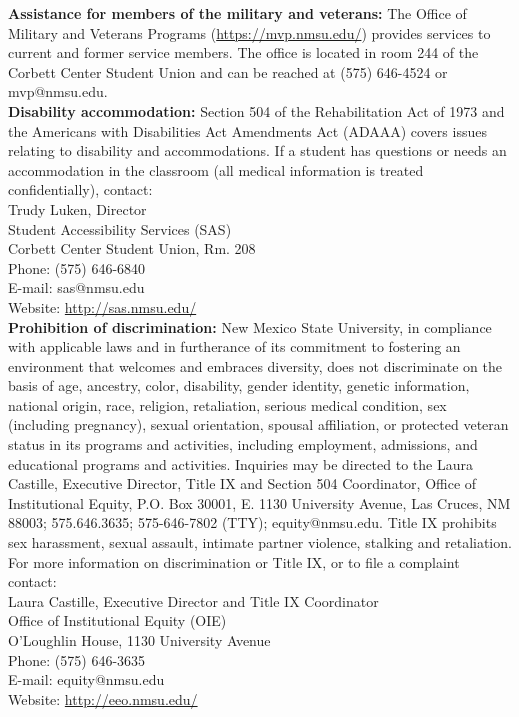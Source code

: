 \documentclass{article}
\begin{document}
\noindent\textbf{Assistance for members of the military and veterans:} The Office of Military and Veterans Programs (\url{https://mvp.nmsu.edu/}) provides services to current and former service members.  The office is located in room 244 of the Corbett Center Student Union and can be reached at (575) 646-4524 or mvp@nmsu.edu. \\

\noindent\textbf{Disability accommodation:} Section 504 of the Rehabilitation Act of 1973 and the Americans with Disabilities Act Amendments Act (ADAAA) covers issues relating to disability and accommodations. If a student has questions or needs an accommodation in the classroom (all medical information is treated confidentially), contact:\\

\noindent Trudy Luken, Director \\
Student Accessibility Services (SAS) \\
Corbett Center Student Union, Rm. 208 \\
Phone: (575) 646-6840 \\
E-mail: sas@nmsu.edu \\
Website: \url{http://sas.nmsu.edu/} \\
 
\noindent\textbf{Prohibition of discrimination:} New Mexico State University, in compliance with applicable laws and in furtherance of its commitment to fostering an environment that welcomes and embraces diversity, does not discriminate on the basis of age, ancestry, color, disability, gender identity, genetic information, national origin, race, religion, retaliation, serious medical condition, sex (including pregnancy), sexual orientation, spousal affiliation, or protected veteran status in its programs and activities, including employment, admissions, and educational programs and activities. Inquiries may be directed to the Laura Castille, Executive Director, Title IX and Section 504 Coordinator, Office of Institutional Equity, P.O. Box 30001, E. 1130 University Avenue, Las Cruces, NM 88003; 575.646.3635; 575-646-7802 (TTY); equity@nmsu.edu. Title IX prohibits sex harassment, sexual assault, intimate partner violence, stalking and retaliation. For more information on discrimination or Title IX, or to file a complaint contact: \\

\noindent Laura Castille, Executive Director and Title IX Coordinator \\
Office of Institutional Equity (OIE) \\
O'Loughlin House, 1130 University Avenue \\
Phone: (575) 646-3635 \\
E-mail: equity@nmsu.edu \\
Website: \url{http://eeo.nmsu.edu/} \\
\end{document}
